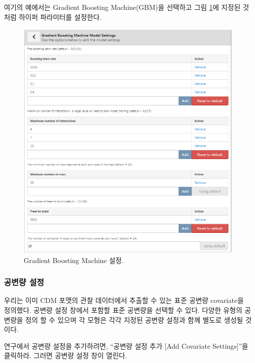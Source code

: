 \documentclass[10.5pt]{book}
\theoremstyle{definition}
\theoremstyle{definition}
\theoremstyle{definition}
\theoremstyle{remark}
\begin{document}
여기의 예에서는 Gradient Boosting Machine(GBM)을 선택하고 그림
\ref{fig:gbmSettings}에 지정된 것처럼 하이퍼 파라미터를 설정한다.

\begin{figure}

{\centering \includegraphics[width=1\linewidth]{images/PatientLevelPrediction/gbmSettings} 

}

\caption{Gradient Boosting Machine 설정.}\label{fig:gbmSettings}
\end{figure}

\subsubsection*{공변량 설정}\label{--1}

우리는 이미 CDM 포맷의 관찰 데이터에서 추출할 수 있는 표준 공변량
covariate을 정의했다. 공변량 설정 창에서 포함할 표준 공변량을 선택할 수
있다. 다양한 유형의 공변량을 정의 할 수 있으며 각 모형은 각각 지정된
공변량 설정과 함께 별도로 생성될 것이다.

연구에서 공변량 설정을 추가하려면, ``공변량 설정 추가 {[}Add Covariate
Settings{]}''을 클릭하라. 그러면 공변량 설정 창이 열린다.
\end{document}
